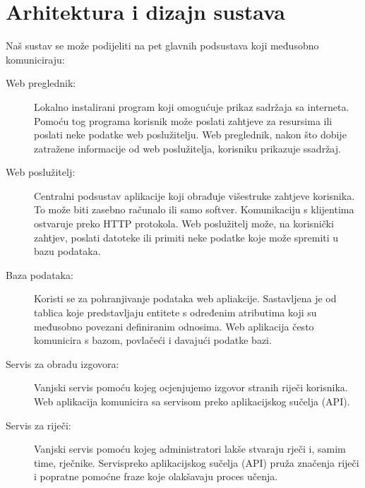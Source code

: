 \chapter{Arhitektura i dizajn sustava}
		
Naš sustav se može podijeliti na pet glavnih podsustava koji međusobno komuniciraju:
\begin{description}
	\item[Web preglednik:] Lokalno instalirani program koji omogućuje prikaz sadržaja sa interneta. 
	Pomoću tog programa korisnik može poslati zahtjeve za 
	resursima ili poslati neke podatke web poslužitelju. Web preglednik, 
	nakon što dobije zatražene informacije od web poslužitelja, korisniku prikazuje ssadržaj.

	\item[Web poslužitelj:] Centralni podsustav aplikacije koji obrađuje višestruke zahtjeve korisnika. To 
	može biti zasebno računalo ili samo softver. Komunikaciju s klijentima ostvaruje preko
	HTTP protokola. Web poslužitelj može, na korisnički zahtjev, poslati datoteke ili primiti
	neke podatke koje može spremiti u bazu podataka.

	\item[Baza podataka:] Koristi se za pohranjivanje podataka web apliakcije. Sastavljena je od tablica koje
	predstavljaju entitete s određenim atributima koji su međusobno povezani definiranim
	odnosima. Web aplikacija često komunicira s bazom, povlačeći i davajući podatke bazi.

	\item[Servis za obradu izgovora:] Vanjski servis pomoću kojeg ocjenjujemo izgovor stranih riječi korisnika. Web
	aplikacija komunicira sa servisom preko aplikacijskog sučelja (API).

	\item[Servis za riječi:] Vanjski servis pomoću kojeg administratori lakše stvaraju rječi i, samim time,
	rječnike. Servispreko aplikacijskog sučelja (API) pruža značenja riječi i 
	popratne pomoćne fraze koje olakšavaju proces učenja.
\end{description}


